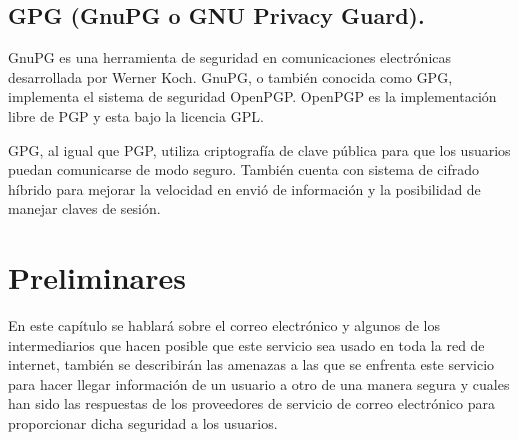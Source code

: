\documentclass[12pt,oneside,onecolumn,openany]{report}
\begin{document}
\section{GPG (GnuPG o GNU Privacy Guard).}
GnuPG es una herramienta de seguridad en comunicaciones electrónicas desarrollada por Werner Koch. GnuPG, o también conocida como GPG, implementa el sistema de seguridad OpenPGP. OpenPGP es la implementación libre de PGP y esta bajo la licencia GPL. 

GPG, al igual que PGP, utiliza criptografía de clave pública para que los usuarios puedan comunicarse de modo seguro. También cuenta con sistema de cifrado híbrido para mejorar la velocidad en envió de información y la posibilidad de manejar claves de sesión.\cite{gpg}
        
\chapter{Preliminares} %
En  este  capítulo  se hablará  sobre  el  correo  electrónico  y  algunos  de  los intermediarios que hacen posible que este servicio sea usado en toda la red de  internet, también  se describirán las  amenazas a  las  que  se   enfrenta  este  servicio para  hacer  llegar  información  de  un  usuario  a  otro  de  una  manera  segura  y  cuales  han 
sido   las   respuestas   de   los   proveedores   de   servicio   de   correo   electrónico   para proporcionar dicha seguridad a los usuarios. 
\end{document}
